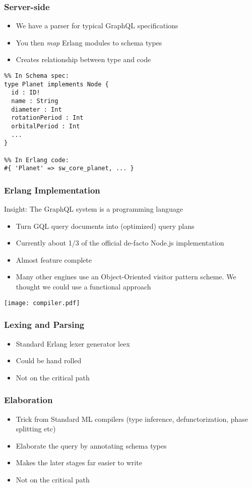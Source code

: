 \documentclass[lualatex]{beamer}
\begin{document}
\begin{frame}[fragile]
  \frametitle{Server-side}
  \begin{itemize}
  \item We have a parser for typical GraphQL specifications
  \item You then \emph{map} Erlang modules to schema types
  \item Creates relationship between type and code
  \end{itemize}
\begin{verbatim}
%% In Schema spec:
type Planet implements Node {
  id : ID!
  name : String
  diameter : Int
  rotationPeriod : Int
  orbitalPeriod : Int
  ...
}

%% In Erlang code:
#{ 'Planet' => sw_core_planet, ... }
\end{verbatim}
\end{frame}

\begin{frame}
  \frametitle{Erlang Implementation}
  Insight: The GraphQL system is a programming language
  \begin{itemize}
  \item Turn GQL query documents into (optimized) query plans
  \item Currently about 1/3 of the official de-facto Node.js
    implementation
  \item Almost feature complete
  \item Many other engines use an Object-Oriented visitor pattern
    scheme. We thought we could use a functional approach
  \end{itemize}
  \texttt{[image: compiler.pdf]}
\end{frame}

\begin{frame}
  \frametitle{Lexing and Parsing}
  \begin{itemize}
  \item Standard Erlang lexer generator leex
  \item Could be hand rolled
  \item Not on the critical path
  \end{itemize}
\end{frame}

\begin{frame}
  \frametitle{Elaboration}
  \begin{itemize}
  \item Trick from Standard ML compilers (type inference,
    defunctorization, phase splitting etc)
  \item Elaborate the query by annotating schema types
  \item Makes the later stages far easier to write
  \item Not on the critical path
  \end{itemize}
\end{frame}
\end{document}
